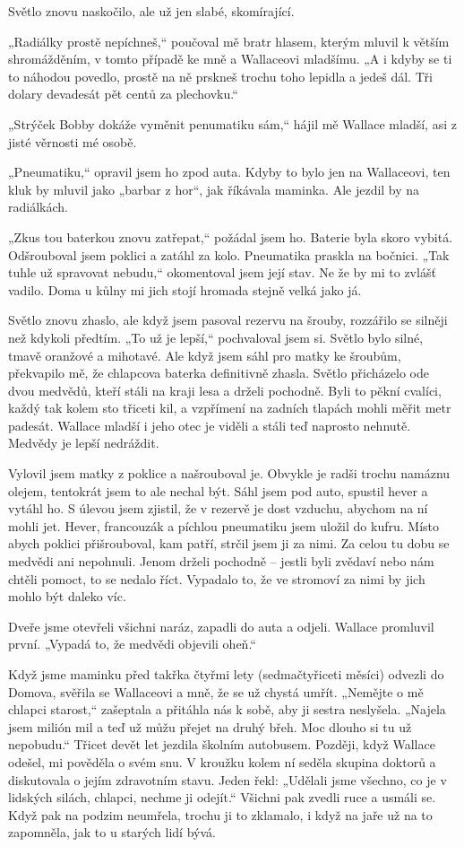 Světlo znovu naskočilo, ale už jen slabé, skomírající.

„Radiálky prostě  nepíchneš,“ poučoval mě bratr hlasem, kterým mluvil k větším shromážděním, v tomto případě ke mně a Wallaceovi mladšímu. „A i kdyby se ti to náhodou povedlo,  prostě na ně prskneš trochu toho lepidla a jedeš dál. Tři dolary devadesát pět centů za plechovku.“

„Strýček Bobby dokáže vyměnit penumatiku sám,“ hájil mě Wallace mladší, asi z jisté věrnosti mé osobě.

„Pneumatiku,“ opravil jsem ho zpod auta. Kdyby to bylo jen na Wallaceovi, ten kluk by mluvil jako „barbar z hor“, jak říkávala maminka. Ale jezdil by na radiálkách.

„Zkus tou baterkou znovu zatřepat,“ požádal jsem ho. Baterie byla skoro vybitá. Odšrouboval jsem poklici a zatáhl za kolo. Pneumatika praskla na bočnici. „Tak tuhle už spravovat nebudu,“ okomentoval jsem její stav. Ne že by mi to zvlášť vadilo. Doma u kůlny mi jich stojí hromada stejně velká jako já.

Světlo znovu zhaslo, ale když jsem pasoval rezervu na šrouby, rozzářilo se silněji než kdykoli předtím. „To už je lepší,“ pochvaloval jsem si. Světlo bylo silné, tmavě oranžové a mihotavé. Ale když jsem sáhl pro matky ke šroubům, překvapilo mě, že chlapcova baterka definitivně zhasla. Světlo přicházelo ode dvou medvědů, kteří stáli na kraji lesa a drželi pochodně. Byli to pěkní cvalíci, každý tak kolem sto třiceti kil, a vzpřímení na zadních tlapách mohli měřit metr padesát. Wallace mladší i jeho otec je viděli a stáli teď naprosto nehnutě. Medvědy je lepší nedráždit.

Vylovil jsem matky z poklice a našrouboval je. Obvykle je radši trochu namáznu olejem, tentokrát jsem to ale nechal být. Sáhl jsem pod auto, spustil hever a vytáhl ho. S úlevou jsem zjistil, že v rezervě je dost vzduchu, abychom na ní mohli jet. Hever, francouzák a píchlou pneumatiku jsem uložil do kufru. Místo abych poklici přišrouboval, kam patří, strčil jsem ji za nimi. Za celou tu dobu se medvědi ani nepohnuli. Jenom drželi pochodně – jestli byli zvědaví nebo nám chtěli pomoct, to se nedalo říct. Vypadalo to, že ve stromoví za nimi by jich mohlo být daleko víc.

Dveře jsme otevřeli všichni naráz, zapadli do auta a odjeli. Wallace promluvil první. „Vypadá to, že medvědi objevili oheň.“

\bigskip

\noindent
Když jsme maminku před takřka čtyřmi lety (sedmačtyřiceti měsíci) odvezli do Domova, svěřila se Wallaceovi a mně, že se už chystá umřít. „Nemějte o mě chlapci starost,“ zašeptala a přitáhla nás k sobě, aby ji sestra neslyšela. „Najela jsem milión mil a teď už můžu přejet na druhý břeh. Moc dlouho si tu už nepobudu.“ Třicet devět let jezdila školním autobusem. Později, když Wallace odešel, mi pověděla o svém snu. V kroužku kolem ní seděla skupina doktorů a diskutovala o jejím zdravotním stavu. Jeden řekl: „Udělali jsme všechno, co je v lidských silách, chlapci, nechme ji odejít.“ Všichni pak zvedli ruce a usmáli se. Když pak na podzim neumřela, trochu ji to zklamalo, i když na jaře už na to zapomněla, jak to u starých lidí bývá.

